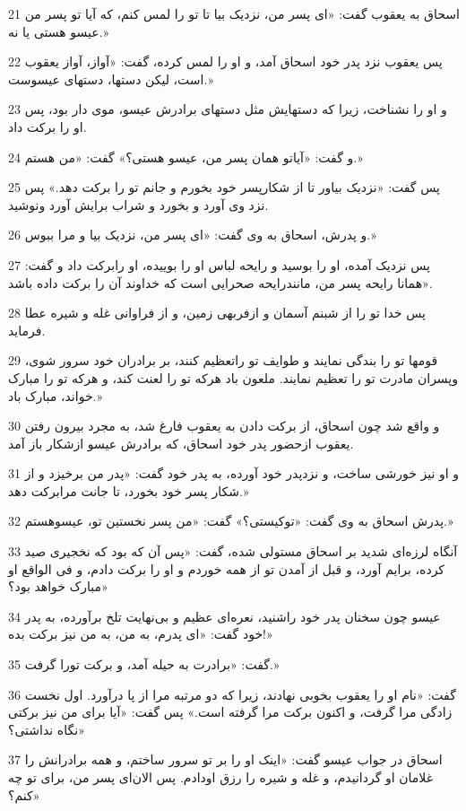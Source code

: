 \par 21 اسحاق به یعقوب گفت: «ای پسر من، نزدیک بیا تا تو را لمس کنم، که آیا تو پسر من عیسو هستی یا نه.»
\par 22 پس یعقوب نزد پدر خود اسحاق آمد، و او را لمس کرده، گفت: «آواز، آواز یعقوب است، لیکن دستها، دستهای عیسوست.»
\par 23 و او را نشناخت، زیرا که دستهایش مثل دستهای برادرش عیسو، موی دار بود، پس او را برکت داد.
\par 24 و گفت: «آیاتو همان پسر من، عیسو هستی؟» گفت: «من هستم.»
\par 25 پس گفت: «نزدیک بیاور تا از شکارپسر خود بخورم و جانم تو را برکت دهد.» پس نزد وی آورد و بخورد و شراب برایش آورد ونوشید.
\par 26 و پدرش، اسحاق به وی گفت: «ای پسر من، نزدیک بیا و مرا ببوس.»
\par 27 پس نزدیک آمده، او را بوسید و رایحه لباس او را بوییده، او رابرکت داد و گفت: «همانا رایحه پسر من، مانندرایحه صحرایی است که خداوند آن را برکت داده باشد.
\par 28 پس خدا تو را از شبنم آسمان و ازفربهی زمین، و از فراوانی غله و شیره عطا فرماید.
\par 29 قومها تو را بندگی نمایند و طوایف تو راتعظیم کنند، بر برادران خود سرور شوی، وپسران مادرت تو را تعظیم نمایند. ملعون باد هرکه تو را لعنت کند، و هر‌که تو را مبارک خواند، مبارک باد.»
\par 30 و واقع شد چون اسحاق، از برکت دادن به یعقوب فارغ شد، به مجرد بیرون رفتن یعقوب ازحضور پدر خود اسحاق، که برادرش عیسو ازشکار باز آمد.
\par 31 و او نیز خورشی ساخت، و نزدپدر خود آورده، به پدر خود گفت: «پدر من برخیزد و از شکار پسر خود بخورد، تا جانت مرابرکت دهد.» 
\par 32 پدرش اسحاق به وی گفت: «توکیستی؟» گفت: «من پسر نخستین تو، عیسوهستم.»
\par 33 آنگاه لرزه‌ای شدید بر اسحاق مستولی شده، گفت: «پس آن که بود که نخجیری صید کرده، برایم آورد، و قبل از آمدن تو از همه خوردم و او را برکت دادم، و فی الواقع او مبارک خواهد بود؟»
\par 34 عیسو چون سخنان پدر خود راشنید، نعره‌ای عظیم و بی‌نهایت تلخ برآورده، به پدر خود گفت: «ای پدرم، به من، به من نیز برکت بده!»
\par 35 گفت: «برادرت به حیله آمد، و برکت تورا گرفت.»
\par 36 گفت: «نام او را یعقوب بخوبی نهادند، زیرا که دو مرتبه مرا از پا درآورد. اول نخست زادگی مرا گرفت، و اکنون برکت مرا گرفته است.» پس گفت: «آیا برای من نیز برکتی نگاه نداشتی؟»
\par 37 اسحاق در جواب عیسو گفت: «اینک او را بر تو سرور ساختم، و همه برادرانش را غلامان او گردانیدم، و غله و شیره را رزق اودادم. پس الان‌ای پسر من، برای تو چه کنم؟»
